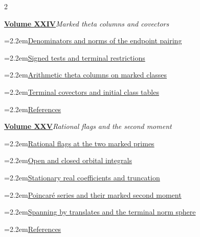 \documentclass[a4paper,11pt]{article}
\theoremstyle{definition}
\theoremstyle{remark}
\numberwithin{equation}{section}
\begin{document}
\begin{multicols}{2}
\begin{minipage}{\linewidth}
\end{minipage}\par\medskip
\noindent\begin{minipage}{\linewidth}\raggedright
\textbf{\hyperref[nav:volume-XXIV]{Volume XXIV}}\enspace\emph{Marked theta columns and covectors}\par\smallskip
\noindent\hangindent=2.2em\hyperref[nav:g-XII-3]{Denominators and norms of the endpoint pairing}\par
\noindent\hangindent=2.2em\hyperref[nav:chapter-signed-terminal-tests]{Signed tests and terminal restrictions}\par
\noindent\hangindent=2.2em\hyperref[nav:chapter-marked-theta-columns]{Arithmetic theta columns on marked classes}\par
\noindent\hangindent=2.2em\hyperref[nav:chapter-terminal-covectors]{Terminal covectors and initial class tables}\par
\noindent\hangindent=2.2em\hyperref[nav:bibliography-XXIV]{References}\par
\end{minipage}\par\medskip
\noindent\begin{minipage}{\linewidth}\raggedright
\textbf{\hyperref[nav:volume-XXV]{Volume XXV}}\enspace\emph{Rational flags and the second moment}\par\smallskip
\noindent\hangindent=2.2em\hyperref[nav:two-mark-flags]{Rational flags at the two marked primes}\par
\noindent\hangindent=2.2em\hyperref[nav:marked-open-closed]{Open and closed orbital integrals}\par
\noindent\hangindent=2.2em\hyperref[nav:stationary-cutoff]{Stationary real coefficients and truncation}\par
\noindent\hangindent=2.2em\hyperref[nav:poincare-spanning]{Poincar\'e series and their marked second moment}\par
\noindent\hangindent=2.2em\hyperref[nav:spanning-and-sphere]{Spanning by translates and the terminal norm sphere}\par
\noindent\hangindent=2.2em\hyperref[nav:bibliography-XXV]{References}\par

\end{minipage}
\end{multicols}
\end{document}
